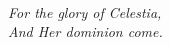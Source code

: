 

\blanknonumber\ \blanknonumber

\vspace*{\fill}

\begin{center}\emph{
%
For the glory of Celestia,\\
And Her dominion come.
%
}
\end{center}

\vfill\vfill\vfill
